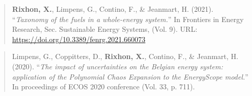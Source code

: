 \begin{small}
\begin{quote}
\textbf{Rixhon, X.}, Limpens, G., Contino, F., \& Jeanmart, H. (2021). ``\emph{Taxonomy of the fuels in a whole-energy system.}'' In Frontiers in Energy Research, Sec. Sustainable Energy Systems, (Vol. 9). URL: \url{https://doi.org/10.3389/fenrg.2021.660073} 
\end{quote}

\begin{quote}
Limpens, G., Coppitters, D., \textbf{Rixhon, X.}, Contino, F., \& Jeanmart, H. (2020). ``\emph{The impact of uncertainties on the Belgian energy system: application of the Polynomial Chaos Expansion to the EnergyScope model.}'' In proceedings of  ECOS 2020 conference (Vol. 33, p. 711).
\end{quote}

\end{small}
